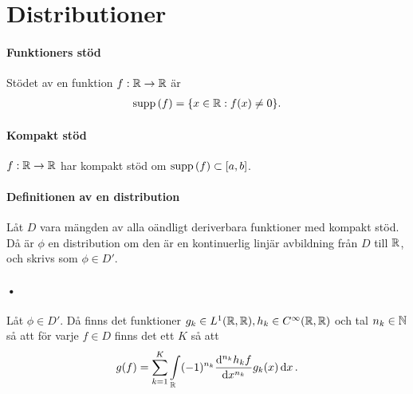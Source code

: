 \section{Distributioner}

\paragraph{Funktioners stöd}
Stödet av en funktion $f: \mathbb{R}\to\mathbb{R}$ är
\begin{align*}
	\text{supp}\left(f\right) = \{x\in\mathbb{R}: f(x)\neq 0\}.
\end{align*}

\paragraph{Kompakt stöd}
$f: \mathbb{R}\to\mathbb{R}$ har kompakt stöd om $\text{supp}\left(f\right)\subset [a, b]$.

\paragraph{Definitionen av en distribution}
Låt $D$ vara mängden av alla oändligt deriverbara funktioner med kompakt stöd. Då är $\phi$ en distribution om den är en kontinuerlig linjär avbildning från $D$ till $\mathbb{R}$, och skrivs som $\phi\in D'$.

\paragraph{•}
Låt $\phi\in D'$. Då finns det funktioner $g_{k}\in L^{1}(\mathbb{R}, \mathbb{R}), h_{k}\in C^{\infty}(\mathbb{R}, \mathbb{R})$ och tal $n_{k}\in\mathbb{N}$ så att för varje $f\in D$ finns det ett $K$ så att
\begin{align*}
	g(f) = \sum\limits_{k = 1}^{K}\int\limits_{\mathbb{R}}^{}(-1)^{n_{k}}\dv[n_{k}]{h_{k}f}{x} (x)g_{k}(x)\dd{x}.
\end{align*}